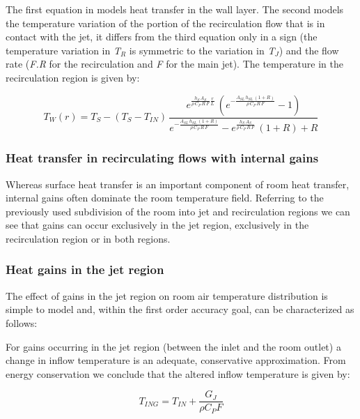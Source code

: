 The first equation in models heat transfer in the wall layer. The second models the temperature variation of the portion of the recirculation flow that is in contact with the jet, it differs from the third equation only in a sign (the temperature variation in \emph{T\(_{R}\)} is symmetric to the variation in \emph{T\(_{J}\)}) and the flow rate (\emph{F.R} for the recirculation and \emph{F} for the main jet). The temperature in the recirculation region is given by:

\begin{equation}
{T_W}(r) = {T_S} - ({T_S} - {T_{IN}})\,\frac{{{e^{\frac{{{h_S}\,{A_S}}}{{\rho \,{C_P}\,R\,F}}\frac{r}{{{L_{}}}}}}\,({e^{ - \frac{{{A_{SL}}\,{h_{SL}}\,(1 + R)}}{{\rho \,{C_P}\,R\,F}}}} - 1)}}{{{e^{ - \frac{{{A_{SL}}\,{h_{SL}}\,(1 + R)}}{{\rho \,{C_P}\,R\,F}}}} - {e^{\frac{{{h_S}\,{A_S}}}{{\rho \,{C_P}\,R\,F}}}}\,(1 + R) + R}}
\end{equation}

\subsubsection{Heat transfer in recirculating flows with internal gains}\label{heat-transfer-in-recirculating-flows-with-internal-gains}

Whereas surface heat transfer is an important component of room heat transfer, internal gains often dominate the room temperature field. Referring to the previously used subdivision of the room into jet and recirculation regions we can see that gains can occur exclusively in the jet region, exclusively in the recirculation region or in both regions.

\subsubsection{Heat gains in the jet region}\label{heat-gains-in-the-jet-region}

The effect of gains in the jet region on room air temperature distribution is simple to model and, within the first order accuracy goal, can be characterized as follows:

For gains occurring in the jet region (between the inlet and the room outlet) a change in inflow temperature is an adequate, conservative approximation. From energy conservation we conclude that the altered inflow temperature is given by:

\begin{equation}
{T_{ING}} = {T_{IN}} + \frac{{{G_J}}}{{\rho {C_P}F}}
\end{equation}

